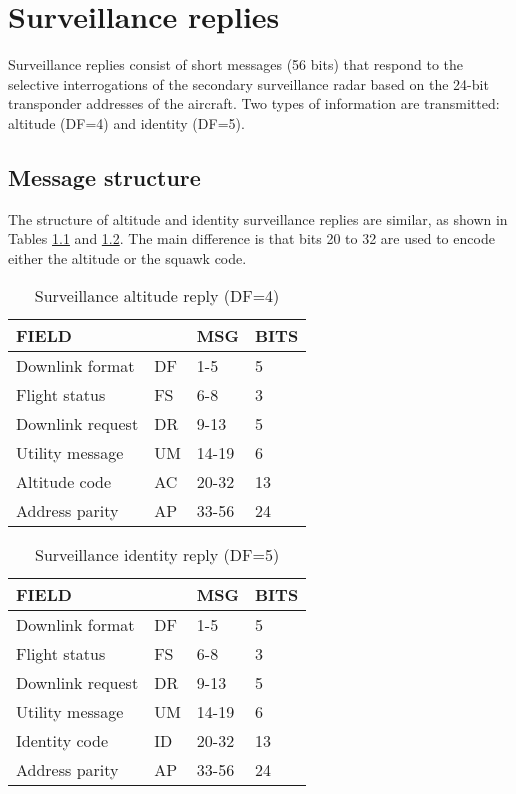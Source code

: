 \chapter{Surveillance replies} \label{chap:surv_reply}

Surveillance replies consist of short messages (56 bits) that respond to the selective interrogations of the secondary surveillance radar based on the 24-bit transponder addresses of the aircraft. Two types of information are transmitted: altitude (DF=4) and identity (DF=5).


\section{Message structure}

The structure of altitude and identity surveillance replies are similar, as shown in Tables \ref{tb:df_4_structure} and \ref{tb:df_5_structure}. The main difference is that bits 20 to 32 are used to encode either the altitude or the squawk code.

\begin{table}[ht]
  \centering
  \caption{Surveillance altitude reply (DF=4)}
  \label{tb:df_4_structure}
  \begin{tabular}[t]{|l|l|l|l|}
  \hline
  \textbf{FIELD} & \textbf{} & \textbf{MSG} & \textbf{BITS} \\ \hline
  Downlink format   & DF & 1-5    & 5   \\ \hline
  Flight status     & FS & 6-8    & 3   \\ \hline
  Downlink request  & DR & 9-13   & 5   \\ \hline
  Utility message   & UM & 14-19  & 6   \\ \hline
  Altitude code     & AC & 20-32  & 13  \\ \hline
  Address parity    & AP & 33-56  & 24  \\ \hline
  \end{tabular}
\end{table}

\begin{table}[ht]
  \centering
  \caption{Surveillance identity reply (DF=5)}
  \label{tb:df_5_structure}
  \begin{tabular}[t]{|l|l|l|l|}
  \hline
  \textbf{FIELD} & \textbf{} & \textbf{MSG} & \textbf{BITS} \\ \hline
  Downlink format   & DF & 1-5    & 5   \\ \hline
  Flight status     & FS & 6-8    & 3   \\ \hline
  Downlink request  & DR & 9-13   & 5   \\ \hline
  Utility message   & UM & 14-19  & 6   \\ \hline
  Identity code     & ID & 20-32  & 13  \\ \hline
  Address parity    & AP & 33-56  & 24  \\ \hline
  \end{tabular}
\end{table}
  

